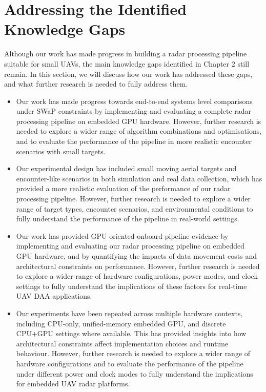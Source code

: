 \section{Addressing the Identified Knowledge Gaps}
Although our work has made progress in building a radar processing pipeline suitable for small UAVs, the main knowledge gaps identified in Chapter 2 still remain. In this section, we will discuss how our work has addressed these gaps, and what further research is needed to fully address them.


\begin{itemize}
    \item Our work has made progress towards end-to-end systems level comparisons under SWaP constraints by implementing and evaluating a complete radar processing pipeline on embedded GPU hardware. However, further research is needed to explore a wider range of algorithm combinations and optimisations, and to evaluate the performance of the pipeline in more realistic encounter scenarios with small targets.
    \item Our experimental design has included small moving aerial targets and encounter-like scenarios in both simulation and real data collection, which has provided a more realistic evaluation of the performance of our radar processing pipeline. However, further research is needed to explore a wider range of target types, encounter scenarios, and environmental conditions to fully understand the performance of the pipeline in real-world settings.
    \item Our work has provided GPU-oriented onboard pipeline evidence by implementing and evaluating our radar processing pipeline on embedded GPU hardware, and by quantifying the impacts of data movement costs and architectural constraints on performance. However, further research is needed to explore a wider range of hardware configurations, power modes, and clock settings to fully understand the implications of these factors for real-time UAV DAA applications.
    \item Our experiments have been repeated across multiple hardware contexts, including CPU-only, unified-memory embedded GPU, and discrete CPU+GPU settings where available. This has provided insights into how architectural constraints affect implementation choices and runtime behaviour. However, further research is needed to explore a wider range of hardware configurations and to evaluate the performance of the pipeline under different power and clock modes to fully understand the implications for embedded UAV radar platforms.
\end{itemize}